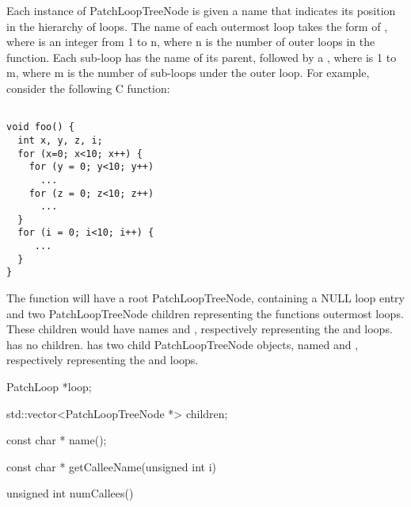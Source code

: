 Each instance of PatchLoopTreeNode is given a name that indicates its position in the hierarchy of loops.
The name of each outermost loop takes the form of , 
where  is an integer from 1 to n,
where n is the number of outer loops in the function.
Each sub-loop has the name of its parent,
followed by a , where  is 1 to m, where m is the number of sub-loops under the outer loop.  
For example, consider the following C function:

\lstset{showstringspaces=false, numbers=none}

\begin{lstlisting}

void foo() {
  int x, y, z, i;
  for (x=0; x<10; x++) {
    for (y = 0; y<10; y++)
      ...
    for (z = 0; z<10; z++)
      ...
  }
  for (i = 0; i<10; i++) {
     ...
  }
}
\end{lstlisting}

The  function will have a root PatchLoopTreeNode, containing a NULL loop entry and 
two PatchLoopTreeNode children representing the functions outermost loops. These children 
would have names  and , respectively representing the  and  loops.  has 
no children.  has two child PatchLoopTreeNode objects, named
 and 
, respectively representing the  and  loops. 

\begin{apient}
PatchLoop *loop;
\end{apient}

\begin{apient}
std::vector<PatchLoopTreeNode *> children;
\end{apient}
    
\begin{apient}
const char * name(); 
\end{apient}
    
\begin{apient}
const char * getCalleeName(unsigned int i)
\end{apient}

\begin{apient}
unsigned int numCallees()
\end{apient}    

